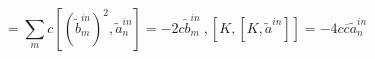 \begin{equation}
[K,\tilde{a}_n^{in}]=
\sum_mc[(\tilde{b}_m^{in})^2,\tilde{a}_n^{in}]=
-2c \tilde{b}_m^{in} \ ,
[K,[K,\tilde{a}^{in}]]=-4c\overline{c}\tilde{a}_n^{in} \ 
\end{equation} 
